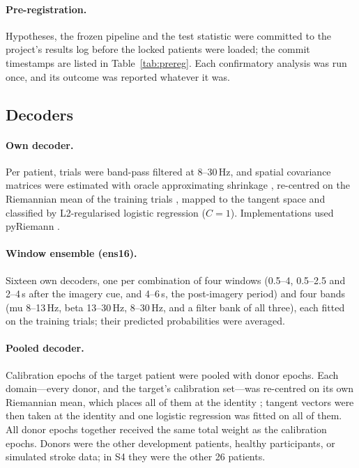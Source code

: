 \documentclass[11pt]{article}
\begin{document}
\paragraph{Pre-registration.} Hypotheses, the frozen pipeline and the test statistic were committed to the project's results log before the locked patients were loaded; the commit timestamps are listed in Table~\ref{tab:prereg}. Each confirmatory analysis was run once, and its outcome was reported whatever it was.

\subsection{Decoders}

\paragraph{Own decoder.} Per patient, trials were band-pass filtered at 8--30\,Hz, and spatial covariance matrices were estimated with oracle approximating shrinkage \citep{chen2010}, re-centred on the Riemannian mean of the training trials \citep{zanini2018}, mapped to the tangent space \citep{barachant2012} and classified by L2-regularised logistic regression ($C = 1$). Implementations used pyRiemann \citep{pyriemann}.

\paragraph{Window ensemble (ens16).} Sixteen own decoders, one per combination of four windows (0.5--4, 0.5--2.5 and 2--4\,s after the imagery cue, and 4--6\,s, the post-imagery period) and four bands (mu 8--13\,Hz, beta 13--30\,Hz, 8--30\,Hz, and a filter bank of all three), each fitted on the training trials; their predicted probabilities were averaged.

\paragraph{Pooled decoder.} Calibration epochs of the target patient were pooled with donor epochs. Each domain---every donor, and the target's calibration set---was re-centred on its own Riemannian mean, which places all of them at the identity \citep{zanini2018}; tangent vectors were then taken at the identity and one logistic regression was fitted on all of them. All donor epochs together received the same total weight as the calibration epochs. Donors were the other development patients, healthy participants, or simulated stroke data; in S4 they were the other 26 patients.
\end{document}
